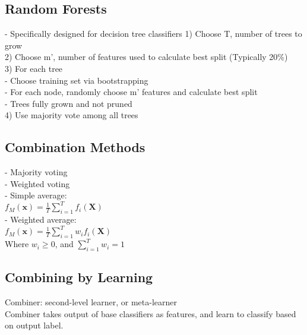 \subsection*{Random Forests}
- Specifically designed for decision tree classifiers
1) Choose T, number of trees to grow\\
2) Choose m', number of features used to calculate best split (Typically 20\%)\\
3) For each tree\\
- Choose training set via bootstrapping\\
- For each node, randomly choose m' features and calculate best split\\
- Trees fully grown and not pruned\\
4) Use majority vote among all trees
\subsection*{Combination Methods}
- Majority voting\\
- Weighted voting\\
- Simple average:\\
$f_M(\mathbf{x}) = \frac{1}{T}\sum^T_{i=1}f_i(\mathbf{X})$\\
- Weighted average:\\
$f_M(\mathbf{x}) = \frac{1}{T}\sum^T_{i=1}w_if_i(\mathbf{X})$\\
Where $w_i \geq 0$, and $\sum^T_{i=1}w_i = 1$\\
\subsection*{Combining by Learning}
Combiner: second-level learner, or meta-learner\\
Combiner takes output of base classifiers as features, and learn to classify 
based on output label.